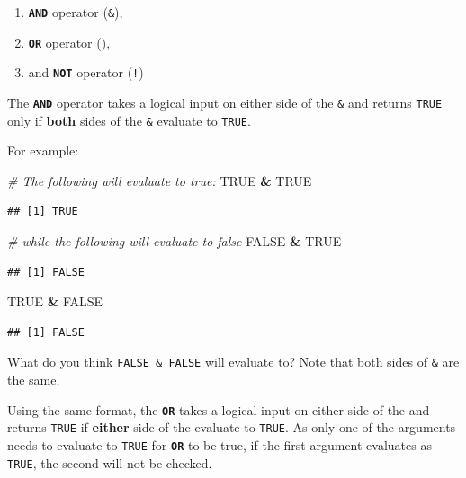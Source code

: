 \documentclass[
]{book}
\newenvironment{Shaded}{\begin{snugshade}}{\end{snugshade}}
\newcommand{\CommentTok}[1]{\textcolor[rgb]{0.56,0.35,0.01}{\textit{#1}}}
\newcommand{\ConstantTok}[1]{\textcolor[rgb]{0.56,0.35,0.01}{#1}}
\newcommand{\SpecialCharTok}[1]{\textcolor[rgb]{0.81,0.36,0.00}{\textbf{#1}}}
\providecommand{\tightlist}{%
  \setlength{\itemsep}{0pt}\setlength{\parskip}{0pt}}
\begin{document}
\begin{enumerate}
\def\labelenumi{\arabic{enumi}.}
\tightlist
\item
  \textbf{\texttt{AND}} operator (\texttt{\&}),
\item
  \textbf{\texttt{OR}} operator (\texttt{\textbar{}}),
\item
  and \textbf{\texttt{NOT}} operator (\texttt{!})
\end{enumerate}

The \textbf{\texttt{AND}} operator takes a logical input on either side of the \texttt{\&} and returns \texttt{TRUE} only if \textbf{both} sides of the \texttt{\&} evaluate to \texttt{TRUE}.

For example:

\begin{Shaded}
\begin{Highlighting}[]
\CommentTok{\# The following will evaluate to true:}
\ConstantTok{TRUE} \SpecialCharTok{\&} \ConstantTok{TRUE} 
\end{Highlighting}
\end{Shaded}

\begin{verbatim}
## [1] TRUE
\end{verbatim}

\begin{Shaded}
\begin{Highlighting}[]
\CommentTok{\# while the following will evaluate to false}
\ConstantTok{FALSE} \SpecialCharTok{\&} \ConstantTok{TRUE}
\end{Highlighting}
\end{Shaded}

\begin{verbatim}
## [1] FALSE
\end{verbatim}

\begin{Shaded}
\begin{Highlighting}[]
\ConstantTok{TRUE} \SpecialCharTok{\&} \ConstantTok{FALSE}
\end{Highlighting}
\end{Shaded}

\begin{verbatim}
## [1] FALSE
\end{verbatim}

What do you think \texttt{FALSE\ \&\ FALSE} will evaluate to? Note that both sides of \texttt{\&} are the same.

Using the same format, the \textbf{\texttt{OR}} takes a logical input on either side of the \texttt{\textbar{}} and returns \texttt{TRUE} if \textbf{either} side of the \texttt{\textbar{}} evaluate to \texttt{TRUE}. As only one of the arguments needs to evaluate to \texttt{TRUE} for \textbf{\texttt{OR}} to be true, if the first argument evaluates as \texttt{TRUE}, the second will not be checked.
\end{document}
